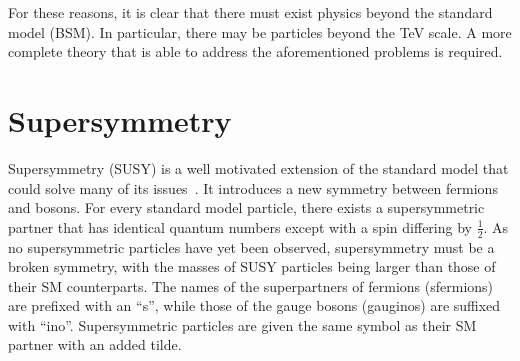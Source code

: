 For these reasons, it is clear that there must exist physics beyond the 
standard model (BSM). In particular, there may be particles beyond the TeV 
scale. 
A more complete theory that is able to address the aforementioned 
problems is required.

\begin{comment}
section{Dark matter}
label{sec:theory-dm}
DELETE - DARK MATTER NO LONGER IN THESIS.

1-1.5 pages. More details on DM (evidence, WIMP miracle, cosmology) (borrow 
from my reports)

Evidence -- see my report.

The most favoured DM candidate is a non-baryonic, weakly interacting massive 
particle (WIMP) which is stable and electrically neutral [8]. WIMPs fall into 
the category of cold dark matter, meaning that they were non-relativistic at 
the time of freeze-out and hence lead to the large scale structures observed in 
the universe today. Their weak interaction cross section also results in the 
correct relic abundance required to explain the present dark matter content of 
the universe (the ``WIMP miracle'').

Searching for DM (report): DD, ID, collider (complimentary). 
\end{comment}

\section{Supersymmetry}
\label{sec:theory-susy}
Supersymmetry (SUSY) is a well motivated extension of the standard model that 
could solve many of its issues~\cite{susy-primer}. It introduces a new symmetry 
between fermions 
and bosons. For every standard model particle, there exists a supersymmetric 
partner that has identical quantum numbers except with a spin differing by 
$\frac{1}{2}$. As no supersymmetric particles have yet been observed, 
supersymmetry must be a broken symmetry, with the masses of SUSY particles 
being larger than those of their SM counterparts. The names of the 
superpartners of fermions (sfermions) are prefixed with an ``s'', while those 
of the gauge bosons (gauginos) are suffixed with ``ino''. Supersymmetric 
particles are given the same symbol as their SM partner with an added tilde.

